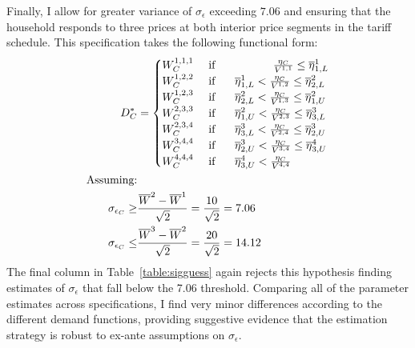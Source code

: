 \documentclass[12pt]{article}
\begin{document}
\begin{appendices}
Finally, I allow for greater variance of $\sigma_{\epsilon}$ exceeding $7.06$ and ensuring that the household responds to three prices at both interior price segments in the tariff schedule.  This specification takes the following functional form:
\begin{align}\label{equation:demandalt2}
\begin{split}
D^{*}_C &=
\begin{cases}
W^{1,1,1}_C   & \text{ if } \hspace{1.7cm}   \frac{ \eta_C }{ V^{1,1} }  \leq \overline{\eta}^{1}_{1,L}  \\
W^{1,2,2}_C   & \text{ if } \hspace{.5cm} \overline{\eta}^{1}_{1,L} <    \frac{ \eta_C }{ V^{1,2} }    \leq \overline{\eta}^{2}_{2,L}  \\
W^{1,2,3}_C   & \text{ if } \hspace{.5cm} \overline{\eta}^{2}_{2,L} <    \frac{ \eta_C }{ V^{1,3} }    \leq \overline{\eta}^{2}_{1,U}  \\
W^{2,3,3}_C   & \text{ if } \hspace{.5cm} \overline{\eta}^{2}_{1,U} <    \frac{ \eta_C }{ V^{2,3} }    \leq \overline{\eta}^{3}_{3,L}  \\ 
W^{2,3,4}_C   & \text{ if } \hspace{.5cm} \overline{\eta}^{3}_{3,L} <    \frac{ \eta_C }{ V^{2,4} }    \leq \overline{\eta}^{3}_{2,U}  \\ 
W^{3,4,4}_C   & \text{ if } \hspace{.5cm} \overline{\eta}^{3}_{2,U} <    \frac{ \eta_C }{ V^{3,4} }    \leq \overline{\eta}^{4}_{3,U}  \\ 
W^{4,4,4}_C   & \text{ if } \hspace{.5cm} \overline{\eta}^{4}_{3,U} <    \frac{ \eta_C }{ V^{4,4} }  
\end{cases}\\
\text{Assuming:}\\
 \sigma_{\epsilon_C} \geq &\frac{  \overline{W}^{2} - \overline{W}^{1} }{ \sqrt{2} } = \frac{ 10 }{  \sqrt{2} } = 7.06 \\
 \sigma_{\epsilon_C} \leq &\frac{  \overline{W}^{3} - \overline{W}^{2} }{ \sqrt{2} } = \frac{ 20 }{  \sqrt{2} } = 14.12
\end{split}
\end{align}
The final column in Table~\ref{table:sigguess} again rejects this hypothesis finding estimates of $\sigma_{\epsilon}$ that fall below the 7.06 threshold.  Comparing all of the parameter estimates across specifications, I find very minor differences according to the different demand functions, providing suggestive evidence that the estimation strategy is robust to ex-ante assumptions on $\sigma_{\epsilon}$.



\end{appendices}
\end{document}
